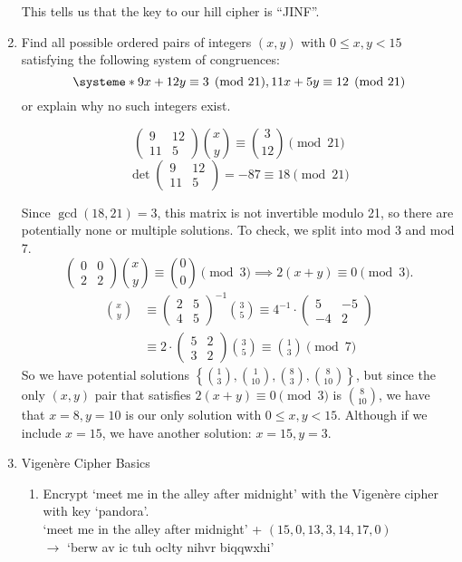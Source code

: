 \documentclass[12pt]{article}
\newcommand{\n}{\vspace{0.5cm}}
\begin{document}
\begin{enumerate}
    This tells us that the key to our hill cipher is ``JINF''. \n

  \item Find all possible ordered pairs of integers \((x,y)\) with \(0 \le x,y<15\) satisfying the following system of congruences:
    \[\systeme*{9x+12y\equiv 3\pmod{21}, 11x+5y\equiv 12\pmod{21}}\] 
    or explain why no such integers exist.

    \[\begin{pmatrix} 9 & 12 \\ 11 & 5 \end{pmatrix} \binom xy \equiv \binom{3}{12} \pmod{21}\]
    \[\det \begin{pmatrix} 9 & 12 \\ 11 & 5 \end{pmatrix} = -87 \equiv 18 \pmod{21}\]

    Since \(\gcd(18, 21) = 3\), this matrix is not invertible modulo 21, so there are potentially none or multiple solutions.  To check, we split into mod 3 and mod 7.
    \[\begin{pmatrix} 0 & 0 \\ 2 & 2 \end{pmatrix} \binom xy \equiv \binom{0}{0} \pmod{3} \implies 2(x+y) \equiv 0 \pmod 3.\]
    \begin{align*}
      \binom xy &\equiv \begin{pmatrix} 2 & 5 \\ 4 & 5 \end{pmatrix}^{-1}\binom35 \equiv 4^{-1} \cdot \begin{pmatrix} 5 & -5 \\ -4 & 2 \end{pmatrix} \\
                &\equiv 2 \cdot \begin{pmatrix} 5 & 2 \\ 3 & 2 \end{pmatrix} \binom35 \equiv \binom13 \pmod7
    \end{align*}
    So we have potential solutions \(\displaystyle\left\{ \binom{1}{3}, \binom{1}{10}, \binom{8}{3}, \binom{8}{10} \right\}\), but since the only \((x,y)\) pair that satisfies \(2(x+y) \equiv 0 \pmod3\) is \(\displaystyle\binom{8}{10}\), we have that \(x=8, y=10\) is our only solution with \(0 \leq x,y < 15\).  Although if we include \(x=15\), we have another solution: \(x=15,y=3\). \n

  \item Vigen\`{e}re Cipher Basics
    \begin{enumerate}
      \item Encrypt `meet me in the alley after midnight' with the Vigen\`{e}re cipher with key `pandora'. \n\\
        `meet me in the alley after midnight' + \((15,0,13,3,14,17,0)\) \\
        \(\to\) `berw av ic tuh oclty nihvr biqqwxhi' \n


\end{enumerate}
\end{enumerate}
\end{document}
